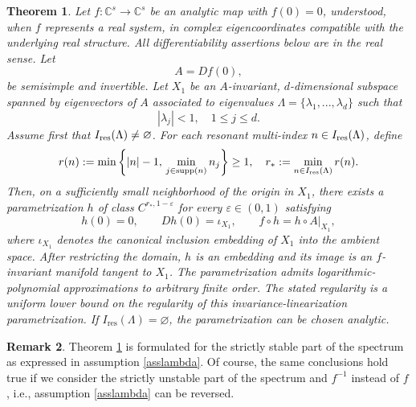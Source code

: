 \documentclass{amsart}
\theoremstyle{plain}
\newtheorem{theorem}{Theorem}[section]
\theoremstyle{definition}
\newtheorem{remark}[theorem]{Remark}
\begin{document}
\begin{theorem}\label{mainthm}
Let $f:\mathbb{C}^s \to\mathbb{C}^s$ be an analytic map with $f(0)=0$, understood, when $f$ represents a real system, in complex eigencoordinates compatible with the underlying real structure. All differentiability assertions below are in the real sense. Let
\begin{equation}
A=Df(0),
\end{equation}
be semisimple and invertible.
Let $X_1$ be an $A$-invariant, $d$-dimensional subspace spanned by eigenvectors of $A$ associated to eigenvalues $\Lambda = \{\lambda_1,...,\lambda_d\}$ such that
\begin{equation}\label{asslambda}
|\lambda_j|< 1,\quad 1\leq j\leq d.
\end{equation}
Assume first that $I_{\rm res}(\Lambda)\neq\varnothing$. For each resonant multi-index $n\in I_{\rm res}(\Lambda)$, define
\begin{equation}\label{def_r_star}
    r(n):=
\min\left\{
|n|-1,\,
\min_{j\in\operatorname{supp}(n)} n_j
\right\} \geq 1,\quad r_*:=
\min_{n\in I_{\rm res}(\Lambda)} r(n).
\end{equation}
Then, on a sufficiently small neighborhood of the origin in $X_1$, there exists a parametrization $h$ of class $C^{r_*,1-\varepsilon}$ for every $\varepsilon\in(0,1)$ satisfying
\begin{equation}
        h(0)=0,\qquad Dh(0)=\iota_{X_1},\qquad f\circ h=h\circ A|_{X_1},
\end{equation}
where $\iota_{X_1}$ denotes the canonical inclusion embedding of $X_1$ into the ambient space. After restricting the domain, $h$ is an embedding and its image is an $f$-invariant manifold tangent to $X_1$. The parametrization admits logarithmic-polynomial approximations to arbitrary finite order. The stated regularity is a uniform lower bound on the regularity of this invariance-linearization parametrization. If $I_{\mathrm{res}}(\Lambda)=\varnothing$, the parametrization can be chosen analytic.
\end{theorem}

\begin{remark}
Theorem \ref{mainthm} is formulated for the strictly stable part of the spectrum as expressed in assumption \eqref{asslambda}. Of course, the same conclusions hold true if we consider the strictly unstable part of the spectrum and  $f^{-1}$ instead of $f$, i.e., assumption \eqref{asslambda} can be reversed.\\
\end{remark}
\end{document}
